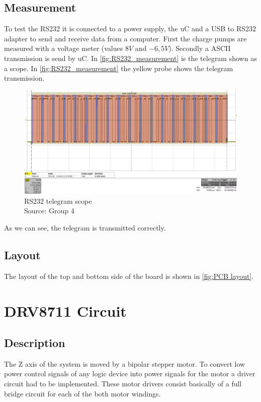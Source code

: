 \documentclass[a4paper,12pt]{scrreprt}
\begin{document}
\subsection{Measurement}
To test the \acs{RS232} it is connected to a power supply, the \acs{uC} and a USB to \acs{RS232} adapter to send and receive data from a computer. First the charge pumps are measured with a voltage meter (values $8V$ and $-6,5V$). Secondly a \acs{ASCII} transmission is send by \acs{uC}. In \autoref{fig:RS232_measurement} is the telegram shown as a scope. In \autoref{fig:RS232_measurement} the yellow probe shows the telegram transmission.

\begin{figure}[H]
  \centering
   \includegraphics[width=1\textwidth]{pictures/measurements/RS232_measurement}
   \caption[\acs{RS232} telegram scope]{\acs{RS232} telegram scope\\
	Source: Group 4  
  }
   \label{fig:RS232_measurement}
\end{figure} 

As we can see, the telegram is transmitted correctly.

\subsection{Layout}
The layout of the top and bottom side of the board is shown in \autoref{fig:PCB layout}.  


\section{DRV8711 Circuit}
\subsection{Description}
The Z axis of the system is moved by a bipolar stepper motor. To convert low power control signals of any logic device into power signals for the motor a driver circuit had to be implemented. These motor drivers consist basically of a full bridge circuit for each of the both motor windings.
\end{document}

